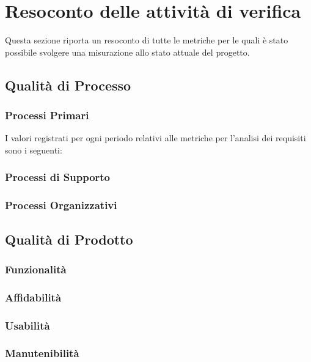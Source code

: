 \section{Resoconto delle attività di verifica}
	Questa sezione riporta un resoconto di tutte le metriche per le quali è stato possibile svolgere una misurazione allo stato attuale del progetto.

	\subsection{Qualità di Processo}
		\subsubsection{Processi Primari}		%
				I valori registrati per ogni periodo relativi alle metriche per l'analisi dei requisiti sono i seguenti:
				
			\pagebreak
				
				
		
		\subsubsection{Processi di Supporto}	%
				
				
				
		
		\pagebreak		
		\subsubsection{Processi Organizzativi}	%
				
			
	\subsection{Qualità di Prodotto}			%
		\subsubsection{Funzionalità}
			
		\subsubsection{Affidabilità}
			
		\subsubsection{Usabilità}
			
		\subsubsection{Manutenibilità}
			
			



